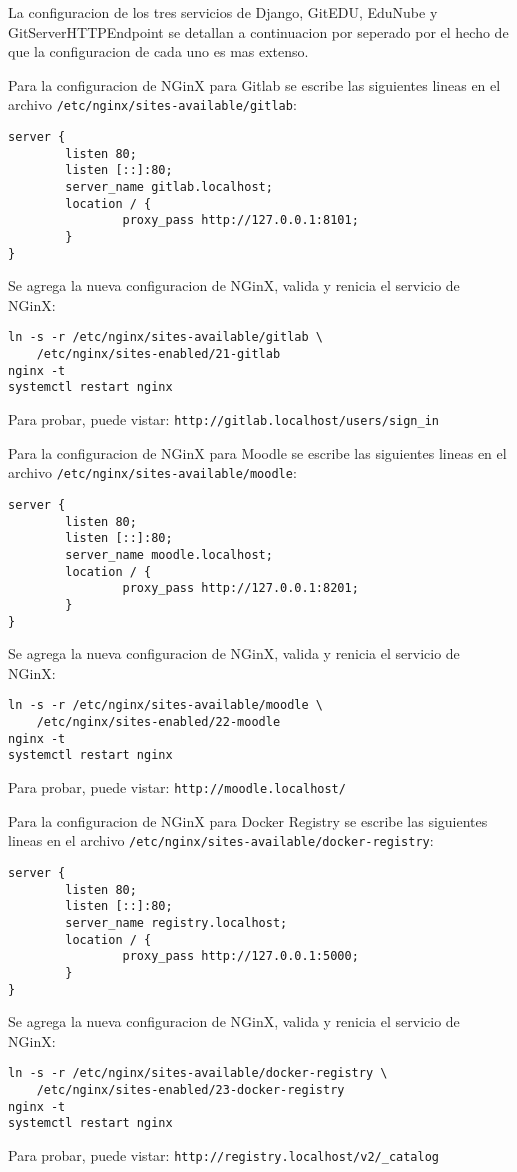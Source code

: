 La configuracion de los tres servicios de Django, GitEDU, EduNube y GitServerHTTPEndpoint se detallan a continuacion por seperado por el hecho de que la configuracion de cada uno es mas extenso.

Para la configuracion de NGinX para Gitlab se escribe las siguientes lineas en el archivo \texttt{/etc/nginx/sites-available/gitlab}:
\begin{lstlisting}
server {
        listen 80;
        listen [::]:80;
        server_name gitlab.localhost;
        location / {
                proxy_pass http://127.0.0.1:8101;
        }
}
\end{lstlisting}
Se agrega la nueva configuracion de NGinX, valida y renicia el servicio de NGinX:
\begin{lstlisting}
ln -s -r /etc/nginx/sites-available/gitlab \ 
    /etc/nginx/sites-enabled/21-gitlab
nginx -t
systemctl restart nginx
\end{lstlisting}
Para probar, puede vistar: \texttt{http://gitlab.localhost/users/sign\_in}

Para la configuracion de NGinX para Moodle se escribe las siguientes lineas en el archivo \texttt{/etc/nginx/sites-available/moodle}:
\begin{lstlisting}
server {
        listen 80;
        listen [::]:80;
        server_name moodle.localhost;
        location / {
                proxy_pass http://127.0.0.1:8201;
        }
}
\end{lstlisting}
Se agrega la nueva configuracion de NGinX, valida y renicia el servicio de NGinX:
\begin{lstlisting}
ln -s -r /etc/nginx/sites-available/moodle \ 
    /etc/nginx/sites-enabled/22-moodle
nginx -t
systemctl restart nginx
\end{lstlisting}
Para probar, puede vistar: \texttt{http://moodle.localhost/}

Para la configuracion de NGinX para Docker Registry se escribe las siguientes lineas en el archivo \texttt{/etc/nginx/sites-available/docker-registry}:
\begin{lstlisting}
server {
        listen 80;
        listen [::]:80;
        server_name registry.localhost;
        location / {
                proxy_pass http://127.0.0.1:5000;
        }
}
\end{lstlisting}
Se agrega la nueva configuracion de NGinX, valida y renicia el servicio de NGinX:
\begin{lstlisting}
ln -s -r /etc/nginx/sites-available/docker-registry \ 
    /etc/nginx/sites-enabled/23-docker-registry
nginx -t
systemctl restart nginx
\end{lstlisting}
Para probar, puede vistar: \texttt{http://registry.localhost/v2/\_catalog}

